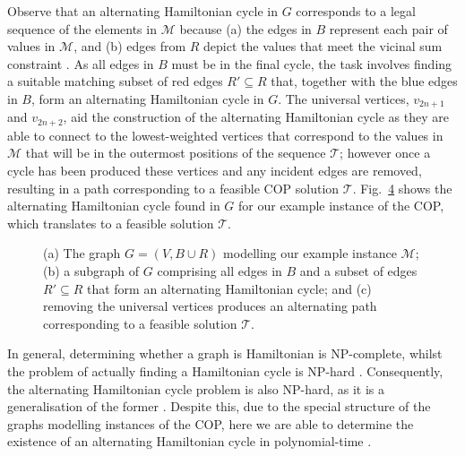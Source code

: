 \documentclass[a4paper,11pt,authoryear]{elsarticle}
\newcommand{\rev}[1]{{\color{myRed}#1}}
\begin{document}
Observe that an alternating Hamiltonian cycle in $G$ corresponds to a legal sequence of the elements in $\mathcal{M}$ because (a) the edges in $B$ represent each pair of values in $\mathcal{M}$, and (b) edges from $R$ depict the values that meet the vicinal sum constraint \citep{hawa2020t}. As all edges in $B$ must be in the final cycle, the task involves finding a suitable matching subset of red edges $R' \subseteq R$ that, together with the blue edges in $B$, form an alternating Hamiltonian cycle in $G$. The universal vertices, $v_{2n+1}$ and $v_{2n+2}$, aid the construction of the alternating Hamiltonian cycle as they are able to connect to the lowest-weighted vertices that correspond to the values in $\mathcal{M}$ that will be in the outermost positions of the sequence $\mathcal{T}$; however once a cycle has been produced these vertices and any incident edges are removed, resulting in a path corresponding to a feasible COP solution $\mathcal{T}$. \rev{Fig.~\ref{fig:althamsoln} shows the alternating Hamiltonian cycle found in $G$ for our example instance of the COP, which translates to a feasible solution $\mathcal{T}$.}

\begin{figure}[h!]	
	\centering
	\begin{subfigure}[b]{0.4\textwidth}
		
		\caption{}
		\label{fig:threshold2}
	\end{subfigure} \hspace{5mm}
	\begin{subfigure}[b]{0.4\textwidth}
		
		\caption{}
		\label{fig:althamcycleordered}
	\end{subfigure}
	\begin{subfigure}[b]{0.75\textwidth}
		
		\caption{}
		\label{fig:solutionpathsimple}
	\end{subfigure}
	\caption{\rev{(a) The graph $G=(V, B \cup R)$ modelling our example instance $\mathcal{M}$; (b) a subgraph of $G$ comprising all edges in $B$ and a subset of edges $R'\subseteq R$ that form an alternating Hamiltonian cycle; and (c) removing the universal vertices produces an alternating path corresponding to a feasible solution $\mathcal{T}$.}}
	\label{fig:althamsoln}
\end{figure}

\noindent In general, determining whether a graph is Hamiltonian is NP-complete, whilst the problem of actually finding a Hamiltonian cycle is NP-hard \citep{karp1972}. Consequently, the alternating Hamiltonian cycle problem is also NP-hard, as it is a generalisation of the former \citep{haggkvist1977}. Despite this, due to the special structure of the graphs modelling instances of the COP, here we are able to determine the existence of an alternating Hamiltonian cycle in polynomial-time \citep{hawa2018}. 
\end{document}

